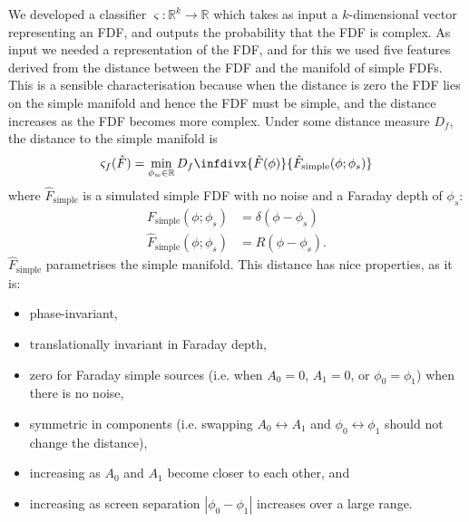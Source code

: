       We developed a classifier $\varsigma : \mathbb R^k \to \mathbb R$ which takes as input a $k$-dimensional vector representing an FDF, and outputs the probability that the FDF is complex. As input we needed a representation of the FDF, and for this we used five features derived from the distance between the FDF and the manifold of simple FDFs. This is a sensible characterisation because when the distance is zero the FDF lies on the simple manifold and hence the FDF must be simple, and the distance increases as the FDF becomes more complex. Under some distance measure $D_f$, the distance to the simple manifold is
      \begin{equation}
          \label{eq:faraday-complexity-model}
          \varsigma_f(\hat F) = \min_{\phi_w \in \mathbb{R}} D_f\infdivx{\hat F(\phi)}{\hat F_{\mathrm{simple}}(\phi; \phi_s)}
      \end{equation}
      where $\hat F_{\mathrm{simple}}$ is a simulated simple FDF with no noise and a Faraday depth of $\phi_s$:
      \begin{align}
          \label{eq:faraday-f-simple}
          F_{\mathrm{simple}}(\phi; \phi_s) &= \delta(\phi - \phi_s)\\
          \hat F_{\mathrm{simple}}(\phi; \phi_s) &= R(\phi - \phi_s).
      \end{align}
      $\hat F_{\mathrm{simple}}$ parametrises the simple manifold. This distance has nice properties, as it is:
      \begin{itemize}
          \item phase-invariant,
          \item translationally invariant in Faraday depth,
          \item zero for Faraday simple sources (i.e. when $A_0 = 0$, $A_1 = 0$, or $\phi_0 = \phi_1$) when there is no noise,
          \item symmetric in components (i.e. swapping $A_0 \leftrightarrow A_1$ and $\phi_0 \leftrightarrow \phi_1$ should not change the distance),
          \item increasing as $A_0$ and $A_1$ become closer to each other, and
          \item increasing as screen separation $|\phi_0 - \phi_1|$ increases over a large range.
      \end{itemize}

